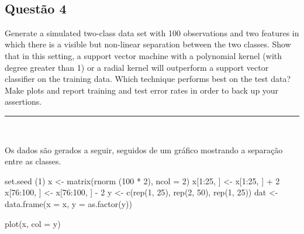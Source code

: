 \documentclass[
  a4paperpaper,
]{article}
\newenvironment{Shaded}{\begin{snugshade}}{\end{snugshade}}
\newcommand{\AttributeTok}[1]{\textcolor[rgb]{0.40,0.45,0.13}{#1}}
\newcommand{\DecValTok}[1]{\textcolor[rgb]{0.68,0.00,0.00}{#1}}
\newcommand{\FunctionTok}[1]{\textcolor[rgb]{0.28,0.35,0.67}{#1}}
\newcommand{\NormalTok}[1]{\textcolor[rgb]{0.00,0.23,0.31}{#1}}
\newcommand{\OtherTok}[1]{\textcolor[rgb]{0.00,0.23,0.31}{#1}}
\newcommand{\SpecialCharTok}[1]{\textcolor[rgb]{0.37,0.37,0.37}{#1}}
\begin{document}
~

\subsection{Questão 4}\label{questuxe3o-4}

Generate a simulated two-class data set with 100 observations and two
features in which there is a visible but non-linear separation between
the two classes. Show that in this setting, a support vector machine
with a polynomial kernel (with degree greater than 1) or a radial kernel
will outperform a support vector classifier on the training data. Which
technique performs best on the test data? Make plots and report training
and test error rates in order to back up your assertions.

\begin{center}\rule{0.5\linewidth}{0.5pt}\end{center}

~

Os dados são gerados a seguir, seguidos de um gráfico mostrando a
separação entre as classes.

\begin{Shaded}
\begin{Highlighting}[]
\FunctionTok{set.seed}\NormalTok{ (}\DecValTok{1}\NormalTok{)}
\NormalTok{x }\OtherTok{\textless{}{-}} \FunctionTok{matrix}\NormalTok{(}\FunctionTok{rnorm}\NormalTok{ (}\DecValTok{100} \SpecialCharTok{*} \DecValTok{2}\NormalTok{), }\AttributeTok{ncol =} \DecValTok{2}\NormalTok{)}
\NormalTok{x[}\DecValTok{1}\SpecialCharTok{:}\DecValTok{25}\NormalTok{, ] }\OtherTok{\textless{}{-}}\NormalTok{ x[}\DecValTok{1}\SpecialCharTok{:}\DecValTok{25}\NormalTok{, ] }\SpecialCharTok{+} \DecValTok{2}
\NormalTok{x[}\DecValTok{76}\SpecialCharTok{:}\DecValTok{100}\NormalTok{, ] }\OtherTok{\textless{}{-}}\NormalTok{ x[}\DecValTok{76}\SpecialCharTok{:}\DecValTok{100}\NormalTok{, ] }\SpecialCharTok{{-}} \DecValTok{2}
\NormalTok{y }\OtherTok{\textless{}{-}} \FunctionTok{c}\NormalTok{(}\FunctionTok{rep}\NormalTok{(}\DecValTok{1}\NormalTok{, }\DecValTok{25}\NormalTok{), }\FunctionTok{rep}\NormalTok{(}\DecValTok{2}\NormalTok{, }\DecValTok{50}\NormalTok{), }\FunctionTok{rep}\NormalTok{(}\DecValTok{1}\NormalTok{, }\DecValTok{25}\NormalTok{))}
\NormalTok{dat }\OtherTok{\textless{}{-}} \FunctionTok{data.frame}\NormalTok{(}\AttributeTok{x =}\NormalTok{ x, }\AttributeTok{y =} \FunctionTok{as.factor}\NormalTok{(y))}

\FunctionTok{plot}\NormalTok{(x, }\AttributeTok{col =}\NormalTok{ y)}
\end{Highlighting}
\end{Shaded}
\end{document}

